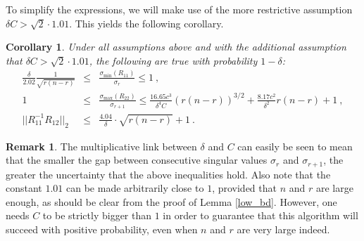 \documentclass{article}
\newcommand{\red}[1]{\textcolor{red}{#1}}
\newtheorem{corollary}[theorem]{Corollary}
\theoremstyle{definition}
\newtheorem{remark}[theorem]{Remark}
\begin{document}
To simplify the expressions, we will make use of the more restrictive assumption $\delta C>\sqrt{2} \cdot 1.01$. This yields the following corollary.

\begin{corollary}
Under all assumptions above and with the additional assumption that $\delta C>\sqrt{2} \cdot 1.01$, the following are true with probability $1-\delta$:
\begin{eqnarray}
\label{unu} \frac{\delta}{2.02} \frac{1}{\sqrt{r (n-r)}} & \leq & \frac{\sigma_{\min}(R_{11})}{\sigma_r} \leq 1 ~,\\ 
\label{doi} 1 & \leq & \frac{\sigma_{\max} (R_{22})}{\sigma_{r+1}} \leq \frac{16.65c^3}{\delta^4C} (r(n-r))^{3/2} +  \frac{8.17c^2}{\delta^2} r(n-r) + 1 ~,\\
\label{trei} ||R_{11}^{-1} R_{12}||_2 & \leq & \frac{4.04}{\delta} \cdot \sqrt{r (n-r)} + 1 ~.
\end{eqnarray}
\end{corollary}


\begin{remark} The multiplicative link between $\delta$ and $C$ can easily be seen to mean that the smaller the gap between consecutive singular values $\sigma_r$ and $\sigma_{r+1}$, the greater the uncertainty that the above inequalities hold. Also note that the constant $1.01$ can be made arbitrarily close to $1$, provided that $n$ and $r$ are large enough, as should be clear from the proof of Lemma \ref{low_bd}.
However, one needs $C$ to be strictly bigger than $1$ in order to guarantee that this algorithm will succeed with positive probability, even when $n$ and $r$ are very large indeed. 
\end{remark}
\end{document}
